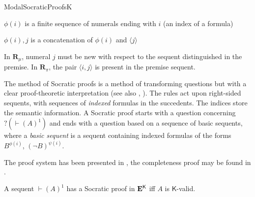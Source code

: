\begin{entry}{ModalSocraticProofsK}
\begin{calculus}
\begin{center}
\bigskip

$\phi(i)$ is a finite sequence of numerals ending with $i$ (an index of a formula)

$\phi(i), j$ is a concatenation of $\phi(i)$ and $\langle j \rangle$
\end{center}

\bigskip

In $\mathbf{R}_\mu$, numeral $j$ must be new with respect to the sequent distinguished in the premise. In $\mathbf{R}_\pi$, the pair $\langle i, j \rangle$ is present in the premise sequent.

\end{calculus}

\begin{clarifications}
The method of Socratic proofs is a method of transforming questions but with a clear proof-theoretic interpretation (see also , ). The rules act upon right-sided sequents, with sequences of \textit{indexed} formulas in the succedents. The indices store the semantic information. A Socratic proof starts with a question concerning $?(\vdash (A)^1)$ and ends with a question based on a sequence of basic sequents, where a \textit{basic sequent} is a sequent containing indexed formulas of the forms $B^{\phi(i)}$, $(\lnot B)^{\psi(i)}$.
\end{clarifications}

\begin{history}
The proof system has been presented in \cite{DLJ:2004}, the completeness proof may be found in \cite{DLJ:2007}.
\end{history}

\begin{technicalities}
A sequent $\vdash (A)^1$ has a Socratic proof in $\mathbf{E}^\mathsf{K}$ iff $A$ is $\mathsf{K}$-valid.
\end{technicalities}













\end{entry}
